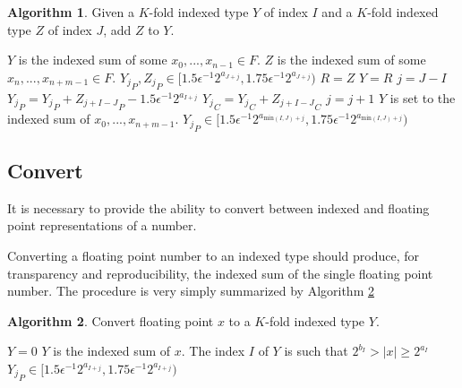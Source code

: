 \documentclass[12pt]{article}
\providecommand{\min}{\ensuremath{\text{min}}}
\theoremstyle{definition}
\newtheorem{alg}{Algorithm}[section]
\numberwithin{equation}{section}
\numberwithin{figure}{section}
\begin{document}
    \begin{samepage}
    \begin{alg}
      Given a $K$-fold indexed type $Y$ of index $I$ and a $K$-fold indexed type $Z$ of index $J$, add $Z$ to $Y$.
      \begin{algorithmic}[1]
        \Ensure
          \Statex $Y$ is the indexed sum of some $x_0, ..., x_{n - 1} \in F$.
          \Statex $Z$ is the indexed sum of some $x_n, ..., x_{n + m - 1} \in F$.
          \Statex ${Y_j}_P, {Z_j}_P \in [1.5  \epsilon^{-1} 2^{a_{J + j}}, 1.75  \epsilon^{-1} 2^{a_{J + j}})$
          \State {}
          \State {}
            \State $R = Z$
            \State {}
            \State $Y = R$
          \EndIf
          \State $j = J - I$
            \State ${Y_{j}}_P = {Y_{j}}_P + {Z_{j + I - J}}_P - 1.5  \epsilon^{-1}  2^{a_{I + j}}$
            \State ${Y_{j}}_C = {Y_{j}}_C + {Z_{j + I - J}}_C$
            \State $j = j + 1$
          \EndWhile
          \State {}
        \EndFunction
        \Ensure
          \Statex $Y$ is set to the indexed sum of $x_0, ..., x_{n + m - 1}$.
          \Statex ${Y_j}_P \in [1.5  \epsilon^{-1} 2^{a_{\min(I, J) + j}}, 1.75  \epsilon^{-1} 2^{a_{\min(I, J) + j}})$
      \end{algorithmic}
      \label{alg:reduce}
    \end{alg}
    \end{samepage}

  \subsection{Convert}
    \label{sec:primitiveops_convert}
    It is necessary to provide the ability to convert between indexed and floating point representations of a number.

    Converting a floating point number to an indexed type should produce, for transparency and reproducibility, the indexed sum of the single floating point number.
    The procedure is very simply summarized by Algorithm \ref{alg:conv2indexed}

    \begin{samepage}
    \begin{alg}
      Convert floating point $x$ to a $K$-fold indexed type $Y$.
      \begin{algorithmic}[1]
          \State $Y = 0$
          \State {}
          \State {} \label{alg:conv2indexed:deposit}
          \State {}
        \EndFunction
        \Ensure
          $Y$ is the indexed sum of $x$.
          The index $I$ of $Y$ is such that $2^{b_I} > |x| \geq 2^{a_I}$
          ${Y_j}_P \in [1.5  \epsilon^{-1} 2^{a_{I + j}}, 1.75  \epsilon^{-1} 2^{a_{I + j}})$
      \end{algorithmic}
      \label{alg:conv2indexed}
    \end{alg}
    \end{samepage}
\end{document}
